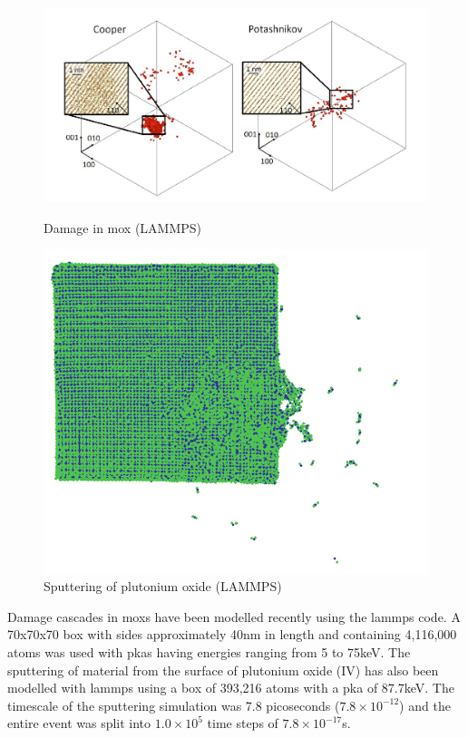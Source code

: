 \FloatBarrier
\begin{figure}[!htb]
\includegraphics[width=\linewidth]{chapters/interatomic_potential_fitting/images/puo2damage.png}
\caption{Damage in \acrshort{mox} (LAMMPS)\cite{moxlammpsdamage}}
\label{fig:feeosplot1}
\endminipage\hfill
{}
\includegraphics[width=\linewidth]{chapters/interatomic_potential_fitting/images/puo-sputtering.png}
\caption{Sputtering of plutonium oxide (LAMMPS)\cite{pusputtering}}
\label{fig:feecplot1}
\endminipage
\end{figure}
\FloatBarrier

Damage cascades in \acrlong{mox}s have been modelled recently using the \acrshort{lammps} code.  A 70x70x70 box with sides approximately 40nm in length and containing 4,116,000 atoms was used with \acrshort{pka}s having energies ranging from 5 to 75keV\cite{moxlammpsdamage}.  The sputtering of material from the surface of plutonium oxide (IV) has also been modelled with \acrshort{lammps} using a box of 393,216 atoms with a \acrshort{pka} of 87.7keV.  The timescale of the sputtering simulation was 7.8 picoseconds ($7.8 \times 10^{-12}$) and the entire event was split into $1.0 \times 10^{5}$ time steps of $7.8 \times 10^{-17}$s.

